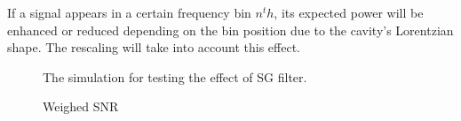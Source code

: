 If a signal appears in a certain frequency bin $n^th$, its expected power will be enhanced or reduced depending on the bin position due to the cavity's Lorentzian shape. The rescaling will take into account this effect.






\begin{figure}[h]
    \begin{minipage}[h]{.5\textwidth}
    \centering
    \caption{The simulation for testing the effect of SG filter.}
    \label{fig:weighted_snr}
    \end{minipage}%
\end{figure}
\begin{figure}[h]
    \begin{minipage}[t]{.5\textwidth}
    \centering
    \caption{Weighed SNR}
    \label{fig:weighted_snr}
    \end{minipage}%
\end{figure}

